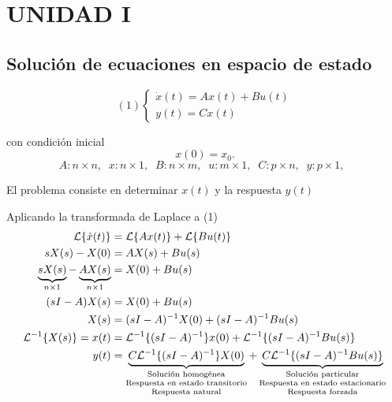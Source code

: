\section{UNIDAD I}
\subsection{Solución de ecuaciones en espacio de estado}
\[
    (1)
    \left\{
        \begin{array}{lll}
            \dot{x}(t) = Ax(t) + Bu(t)\\
            y(t) = Cx(t)
        \end{array}
    \right.
\]

con condición inicial
\[ x(0) = x_{0}.\]
\[
A:n\times n,\;\; 
x:n\times 1,\;\;
B:n\times m,\;\;
u:m\times 1,\;\;
C:p\times n,\;\;
y:p\times 1,\;\;
\]

El problema consiste en determinar \(x(t)\) y la respuesta \(y(t)\)

Aplicando la transformada de Laplace a (1)
\[
\begin{split}
    \mathcal{L} \{ \dot{x}(t) \} & = \mathcal{L} \{ Ax(t) \} + \mathcal{L} \{ Bu(t) \} \\
    sX(s) - X(0) & = AX(s) + Bu(s) \\
    \underbrace{sX(s)}_{n \times 1} - \underbrace{AX(s)}_{n \times 1} & = X(0) + Bu(s) \\
    (sI-A)X(s) & = X(0) + Bu(s) \\
    X(s) & = (sI-A)^{-1}X(0) + (sI-A)^{-1}Bu(s) \\
    \mathcal{L}^{-1} \{ X(s) \} = x(t) & = \mathcal{L}^{-1} \{ (sI-A)^{-1} \} x(0) + \mathcal{L}^{-1} \{ (sI-A)^{-1}Bu(s) \} \\
    y(t) & = 
        \underbrace{ C\mathcal{L}^{-1} \{ (sI-A)^{-1} \}X(0) }_
        {
        \begin{scriptsize}
            \begin{matrix}
                \text{Solución homogénea} \\
                \text{Respuesta en estado transitorio} \\
                \text{Respuesta natural} \\
            \end{matrix}
        \end{scriptsize}
        }+
        \underbrace{ C\mathcal{L}^{-1} \{ (sI-A)^{-1}Bu(s) \} }_
        {
        \begin{scriptsize}
            \begin{matrix}
                \text{Solución particular} \\
                \text{Respuesta en estado estacionario} \\
                \text{Respuesta forzada} \\
            \end{matrix}
        \end{scriptsize}
        }
\end{split}
\]